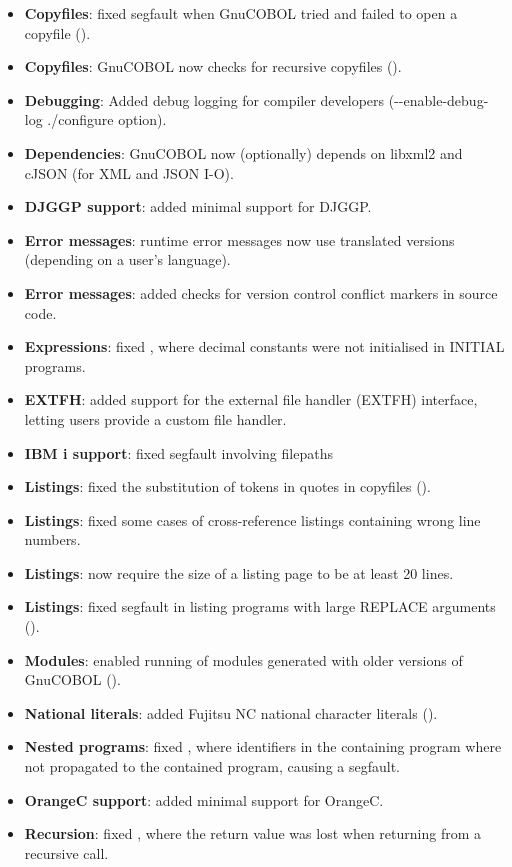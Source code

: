 \begin{itemize}
\item \textbf{Copyfiles}: fixed segfault when GnuCOBOL tried and failed to open a copyfile ().
\item \textbf{Copyfiles}: GnuCOBOL now checks for recursive copyfiles ().
\item \textbf{Debugging}: Added debug logging for compiler developers (-{}-enable-debug-log ./configure option).
\item \textbf{Dependencies}: GnuCOBOL now (optionally) depends on libxml2 and cJSON (for XML and JSON I-O).
\item \textbf{DJGGP support}: added minimal support for DJGGP.
\item \textbf{Error messages}: runtime error messages now use translated versions (depending on a user's language).
\item \textbf{Error messages}: added checks for version control conflict markers in source code.
\item \textbf{Expressions}: fixed , where decimal constants were not initialised in INITIAL programs.
\item \textbf{EXTFH}: added support for the external file handler (EXTFH) interface, letting users provide a custom file handler.
\item \textbf{IBM i support}: fixed segfault involving filepaths
\item \textbf{Listings}: fixed the substitution of tokens in quotes in copyfiles ().
\item \textbf{Listings}: fixed some cases of cross-reference listings containing wrong line numbers.
\item \textbf{Listings}: now require the size of a listing page to be at least 20 lines.
\item \textbf{Listings}: fixed segfault in listing programs with large REPLACE arguments ().
\item \textbf{Modules}: enabled running of modules generated with older versions of GnuCOBOL ().
\item \textbf{National literals}: added Fujitsu NC national character literals ().
\item \textbf{Nested programs}: fixed , where identifiers in the containing program where not propagated to the contained program, causing a segfault.
\item \textbf{OrangeC support}: added minimal support for OrangeC.
\item \textbf{Recursion}: fixed , where the return value was lost when returning from a recursive call.

\end{itemize}

